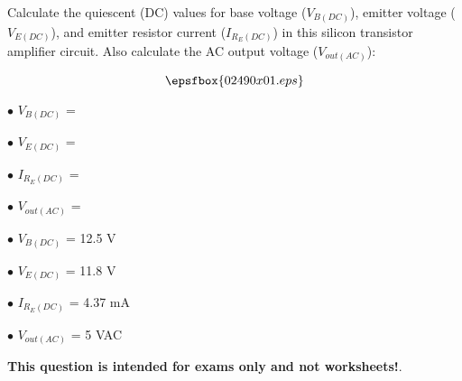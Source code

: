 

Calculate the quiescent (DC) values for base voltage ($V_{B(DC)}$), emitter voltage ($V_{E(DC)}$), and emitter resistor current ($I_{R_E(DC)}$) in this silicon transistor amplifier circuit.  Also calculate the AC output voltage ($V_{out(AC)}$):

$$\epsfbox{02490x01.eps}$$

\medskip
\item{$\bullet$} $V_{B(DC)}$ = 
\item{$\bullet$} $V_{E(DC)}$ = 
\item{$\bullet$} $I_{R_E(DC)}$ = 
\item{$\bullet$} $V_{out(AC)}$ = 
\medskip







\medskip
\goodbreak
\item{$\bullet$} $V_{B(DC)}$ = 12.5 V
\item{$\bullet$} $V_{E(DC)}$ = 11.8 V
\item{$\bullet$} $I_{R_E(DC)}$ = 4.37 mA
\item{$\bullet$} $V_{out(AC)}$ = 5 VAC
\medskip







{\bf This question is intended for exams only and not worksheets!}.




